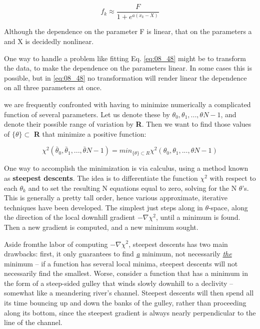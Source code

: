 \begin{equation}\label{eq:08_48}
f_{k} \approx \frac{F}{1+e^{a(x_{k}-X)}}
\end{equation}

Although the dependence on the parameter F is linear, that on the parameters a and X is decidedly nonlinear.

One way to handle a problem like fitting Eq. \ref{eq:08_48} might be to transform the data, to make the dependence on the parameters linear. In some cases this is possible, but in \ref{eq:08_48} no transformation will render linear the dependence on all three parameters at once.

 we are frequently confronted with having to minimize numerically a complicated function of several parameters. Let us denote these by $\theta_{0}, \theta_{1}, ... , \theta{N-1}$, and denote their possible range of variation by \textbf{R}. Then we want to find those values of $\{ \theta \} \subset$ \textbf{R} that minimize a positive function:

\begin{equation}
\chi^{2} (\bar{\theta}_{0}, \bar{\theta}_{1}, ... , \bar{\theta}{N-1}) = min_{\{ \theta \} \subset R} \chi^{2} (\theta_{0}, \theta_{1}, ... , \theta{N-1})
\end{equation}

One way to accomplish the minimization is via calculus, using a method known as \textbf{steepest descents}. The idea is to differentiate the function $\chi^{2}$ with respect to each $\theta_{k}$ and to set the resulting N equations equal to zero, solving for the N $\theta$'s. This is generally a pretty tall order, hence various approximate, iterative techniques have been developed. The simplest just steps along in $\theta$-space, along the direction of the local downhill gradient $-\nabla\chi^{2}$, until a minimum is found. Then a new gradient is computed, and a new minimum sought.

Aside fromthe labor of computing $-\nabla\chi^{2}$, steepest descents has two main drawbacks: first, it only guarantees to find \underline{\textit{a}} minimum, not necessarily \underline{\textit{the}} minimum -- if a function has several local minima, steepest descents will not necessarily find the smallest. Worse, consider a function that has a minimum in the form of a steep-sided gulley that winds slowly downhill to a declivity -- somewhat like a meandering river's channel. Steepest descents will then spend all its time bouncing up and down the banks of the gulley, rather than proceeding along its bottom, since the steepest gradient is always nearly perpendicular to the line of the channel.

